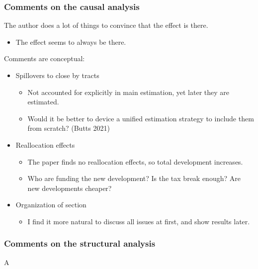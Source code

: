 \documentclass[aspectratio=169, t]{beamer}
\begin{document}
\begin{frame}
    \frametitle{Comments on the causal analysis}
    
    The author does a lot of things to convince that the effect is there.
    \begin{itemize}
        \item The effect seems to always be there.
    \end{itemize}

    \vspace{2mm}
    Comments are conceptual:
    \begin{itemize}
        \pause
        \vspace{1mm}
        \item Spillovers to close by tracts
        \begin{itemize}
            \item Not accounted for explicitly in main estimation, yet later they are estimated.
            \item Would it be better to device a unified estimation strategy to include them from scratch? (Butts 2021)
        \end{itemize}
        \pause
        \vspace{1mm}
        \item Reallocation effects
        \begin{itemize}
            \item The paper finds no reallocation effects, so total development increases.
            \item Who are funding the new development? Is the tax break enough? Are new developments cheaper?
        \end{itemize}
        \pause
        \vspace{1mm}
        \item Organization of section
        \begin{itemize}
            \item I find it more natural to discuss all issues at first, and show results later.
        \end{itemize}
    \end{itemize}

\end{frame}

\begin{frame}
    \frametitle{Comments on the structural analysis}
    
    A

\end{frame}
\end{document}
